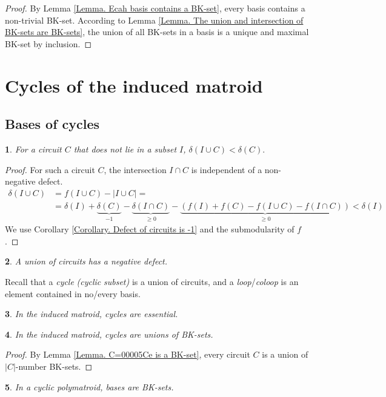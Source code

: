\documentclass[11pt]{article}
\theoremstyle{plain}
\newtheorem{thm}{\protect\theoremname}[section]
\theoremstyle{definition}
\theoremstyle{remark}
\theoremstyle{plain}
\newtheorem{lem}[thm]{\protect\lemmaname}
\theoremstyle{plain}
\theoremstyle{plain}
\newtheorem{cor}[thm]{\protect\corollaryname}
\theoremstyle{definition}
\providecommand{\corollaryname}{Corollary}
\providecommand{\lemmaname}{Lemma}
\providecommand{\theoremname}{Theorem}
\begin{document}
\begin{proof}
By Lemma \ref{Lemma. Ecah basis contains a BK-set}, every basis contains
a non-trivial BK-set. According to Lemma \ref{Lemma. The union and intersection of BK-sets are BK-sets},
the union of all BK-sets in a basis is a unique and maximal BK-set
by inclusion.
\end{proof}

\section{Cycles of the induced matroid}

\subsection{Bases of cycles}
\begin{lem}
\label{Lemma. Union with a circuit decreases the defect}For a circuit
$C$ that does not lie in a subset $I$, $\delta(I\cup C)<\delta(C).$
\end{lem}

\begin{proof}
For such a circuit $C$, the intersection $I\cap C$ is independent
of a non-negative defect.
\begin{align*}
\delta(I\cup C) & =f(I\cup C)-|I\cup C|=\\
 & =\delta(I)+\underbrace{\delta(C)}_{-1}-\underbrace{\delta(I\cap C)}_{\geq0}-\underbrace{(f(I)+f(C)-f(I\cup C)-f(I\cap C))}_{\geq0}<\delta(I)
\end{align*}
We use Corollary \ref{Corollary. Defect of circuits is -1} and the
submodularity of $f$.
\end{proof}
\begin{cor}
A union of circuits has a negative defect.
\end{cor}

Recall that a \textit{cycle} \textit{(cyclic} \textit{subset)} is
a union of circuits, and a \textit{loop}/\textit{coloop} is an element
contained in no/every basis.
\begin{cor}
\label{Corollary. Cyclics are essential}In the induced matroid, cycles
are essential.
\end{cor}

\begin{lem}
\label{Lemma. Cyclics are unions of BK-sets}In the induced matroid,
cycles are unions of BK-sets.
\end{lem}

\begin{proof}
By Lemma \ref{Lemma. C=00005Ce is a BK-set}, every circuit $C$ is
a union of $|C|$-number BK-sets.
\end{proof}
\begin{thm}
\label{Theorem. In cyclic, bases are BK}In a cyclic polymatroid,
bases are BK-sets.
\end{thm}
\end{document}
